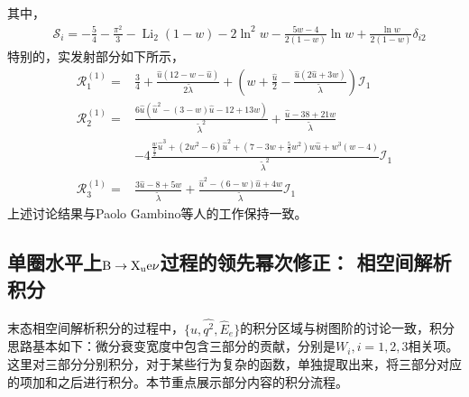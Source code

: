     其中，
            \begin{equation}
                \begin{aligned}
                &\mathcal{S}_i=-\frac{5}{4}-\frac{\pi^2}{3}-\operatorname{Li}_2(1-w)-2 \ln ^2 w-\frac{5 w-4}{2(1-w)} \ln w+\frac{\ln w}{2(1-w)} \delta_{i 2}
                \end{aligned}
                \end{equation}
            特别的，实发射部分如下所示，
            \begin{equation}
                \begin{aligned}
                \mathcal{R}_1^{(1)}= & \frac{3}{4}+\frac{\hat{u}(12-w-\hat{u})}{2 \tilde{\lambda}}+\left(w+\frac{\hat{u}}{2}-\frac{\hat{u}(2 \hat{u}+3 w)}{\tilde{\lambda}}\right) \mathcal{I}_1 \\
                \mathcal{R}_2^{(1)}= & \frac{6 \hat{u}\left(\hat{u}^2-(3-w) \hat{u}-12+13 w\right)}{\tilde{\lambda}^2}+\frac{\hat{u}-38+21 w}{\tilde{\lambda}} \\
                & -4 \frac{\frac{w}{\frac{2}{2}} \hat{u}^3+\left(2 w^2-6\right) \hat{u}^2+\left(7-3 w+\frac{5}{2} w^2\right) w \hat{u}+w^3(w-4)}{\tilde{\lambda}^2} \mathcal{I}_1 \\
                \mathcal{R}_3^{(1)}= & \frac{3 \hat{u}-8+5 w}{\tilde{\lambda}}+\frac{\hat{u}^2-(6-w) \hat{u}+4 w}{\tilde{\lambda}} \mathcal{I}_1
                \end{aligned}
                \end{equation}
上述讨论结果与Paolo Gambino等人的工作保持一致。
\subsection{单圈水平上$\mathrm{B\to X_{u}e\nu}$过程的领先幂次修正： 相空间解析积分}

末态相空间解析积分的过程中，$\{\hat{u}, \hat{q^2}, \hat{E}_{e}\}$的积分区域与树图阶的讨论一致，积分思路基本如下：微分衰变宽度中包含三部分的贡献，分别是$W_{i},i=1,2,3$相关项。这里对三部分分别积分，对于某些行为复杂的函数，单独提取出来，将三部分对应的项加和之后进行积分。本节重点展示部分内容的积分流程。
